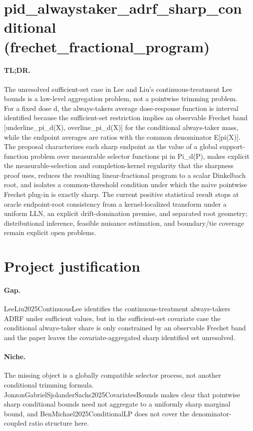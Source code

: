 \documentclass{article}
\begin{document}
\section*{pid_alwaystaker_adrf_sharp_conditional (frechet_fractional_program)}

\paragraph{TL;DR.} The unresolved sufficient-set case in Lee and Liu's continuous-treatment Lee bounds is a law-level aggregation problem, not a pointwise trimming problem. For a fixed dose d, the always-takers average dose-response function is interval identified because the sufficient-set restriction implies an observable Frechet band [underline_pi_d(X), overline_pi_d(X)] for the conditional always-taker mass, while the endpoint averages are ratios with the common denominator E[pi(X)]. The proposal characterizes each sharp endpoint as the value of a global support-function problem over measurable selector functions pi in Pi_d(P), makes explicit the measurable-selection and completion-kernel regularity that the sharpness proof uses, reduces the resulting linear-fractional program to a scalar Dinkelbach root, and isolates a common-threshold condition under which the naive pointwise Frechet plug-in is exactly sharp. The current positive statistical result stops at oracle endpoint-root consistency from a kernel-localized transform under a uniform LLN, an explicit drift-domination premise, and separated root geometry; distributional inference, feasible nuisance estimation, and boundary/tie coverage remain explicit open problems.

\section{Project justification}

\paragraph{Gap.} LeeLiu2025ContinuousLee identifies the continuous-treatment always-takers ADRF under sufficient values, but in the sufficient-set covariate case the conditional always-taker share is only constrained by an observable Frechet band and the paper leaves the covariate-aggregated sharp identified set unresolved.

\paragraph{Niche.} The missing object is a globally compatible selector process, not another conditional trimming formula. JonzonGabrielSjolanderSachs2025CovariatesBounds makes clear that pointwise sharp conditional bounds need not aggregate to a uniformly sharp marginal bound, and BenMichael2025ConditionalLP does not cover the denominator-coupled ratio structure here.
\end{document}
